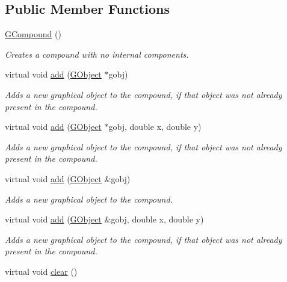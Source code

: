 \subsection*{Public Member Functions}
\begin{DoxyCompactItemize}
\item 
\mbox{\hyperlink{classGCompound_a96d2773de31d81df96135d8621cf47df}{G\+Compound}} ()
\begin{DoxyCompactList}\small\item\em Creates a compound with no internal components. \end{DoxyCompactList}\item 
virtual void \mbox{\hyperlink{classGCompound_afe8277e7b2627513c6f7452fb0b2847d}{add}} (\mbox{\hyperlink{classGObject}{G\+Object}} $\ast$gobj)
\begin{DoxyCompactList}\small\item\em Adds a new graphical object to the compound, if that object was not already present in the compound. \end{DoxyCompactList}\item 
virtual void \mbox{\hyperlink{classGCompound_a8bb36f245efc7806414a1339c2befa1c}{add}} (\mbox{\hyperlink{classGObject}{G\+Object}} $\ast$gobj, double x, double y)
\begin{DoxyCompactList}\small\item\em Adds a new graphical object to the compound, if that object was not already present in the compound. \end{DoxyCompactList}\item 
virtual void \mbox{\hyperlink{classGCompound_ac732fc2123d7a6d7e2de145fe9bbd8e8}{add}} (\mbox{\hyperlink{classGObject}{G\+Object}} \&gobj)
\begin{DoxyCompactList}\small\item\em Adds a new graphical object to the compound. \end{DoxyCompactList}\item 
virtual void \mbox{\hyperlink{classGCompound_a5b11b532869632a6c26b098b0858eac5}{add}} (\mbox{\hyperlink{classGObject}{G\+Object}} \&gobj, double x, double y)
\begin{DoxyCompactList}\small\item\em Adds a new graphical object to the compound, if that object was not already present in the compound. \end{DoxyCompactList}\item 
virtual void \mbox{\hyperlink{classGCompound_ac8bb3912a3ce86b15842e79d0b421204}{clear}} ()

\end{DoxyCompactItemize}
